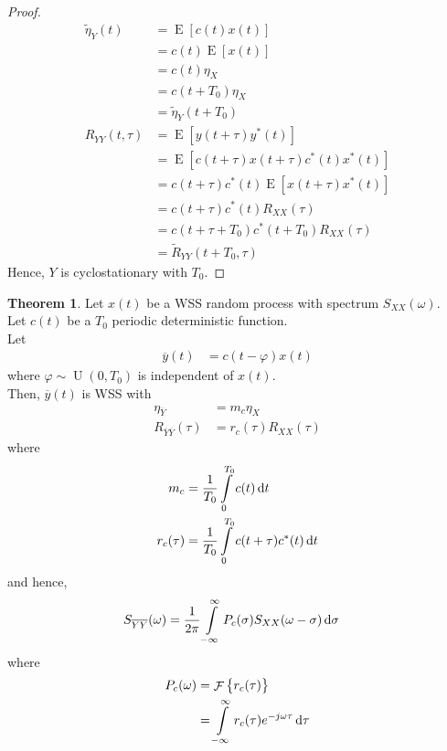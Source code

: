 \documentclass[titlepage, fleqn, a4paper, 12pt, twoside]{article}
\theoremstyle{definition}
\theoremstyle{theorem}
\newtheorem{theorem}{Theorem}
\renewcommand{\tilde}{\widetilde}
\DeclareMathOperator{\expct}{\mathrm{E}}
\DeclareMathOperator{\uniform}{\mathrm{U}}
\DeclareMathOperator{\FT}{\mathcal{F}}
\begin{document}
\begin{proof}
	\begin{align*}
		\tilde{\eta}_Y(t) &= \expct\left[ c(t) x(t) \right]\\
		&= c(t) \expct\left[ x(t) \right]\\
		&= c(t) \eta_X\\
		&= c(t + T_0) \eta_X\\
		&= \tilde{\eta}_Y(t + T_0)\\
		R_{Y Y}(t,\tau) &= \expct\left[ y(t + \tau) y^*(t) \right]\\
		&= \expct\left[ c(t + \tau) x(t + \tau) c^*(t) x^*(t) \right]\\
		&= c(t + \tau) c^*(t) \expct\left[ x(t + \tau) x^*(t) \right]\\
		&= c(t + \tau) c^*(t) R_{X X}(\tau)\\
		&= c(t + \tau + T_0) c^*(t + T_0) R_{X X}(\tau)\\
		&= \tilde{R}_{Y Y}(t + T_0,\tau)
	\end{align*}
	Hence, $Y$ is cyclostationary with $T_0$.
\end{proof}

\begin{theorem}
	Let $x(t)$ be a WSS random process with spectrum $S_{X X}(\omega)$.\\
	Let $c(t)$ be a $T_0$ periodic deterministic function.\\
	Let
	\begin{align*}
		\overline{y}(t) &= c(t - \varphi) x(t)
	\end{align*}
	where $\varphi \sim \uniform(0,T_0)$ is independent of $x(t)$.\\
	Then, $\overline{y}(t)$ is WSS with
	\begin{align*}
		\eta_{\overline{Y}} &= m_c \eta_X\\
		R_{\overline{Y} \overline{Y}}(\tau) &= r_c(\tau) R_{X X}(\tau)
	\end{align*}
	where
	\begin{align*}
		m_c &= \frac{1}{T_0} \int\limits_{0}^{T_0} c(t) \dif t\\
		r_c(\tau) &= \frac{1}{T_0} \int\limits_{0}^{T_0} c(t + \tau) c^*(t) \dif t
	\end{align*}
	and hence,
	\begin{align*}
		S_{\overline{Y} \overline{Y}}(\omega) &= \frac{1}{2 \pi} \int\limits_{-\infty}^{\infty} P_c(\sigma) S_{X X}(\omega - \sigma) \dif \sigma
	\end{align*}
	where
	\begin{align*}
		P_c(\omega) &= \FT\left\{ r_c(\tau) \right\}\\
		&= \int\limits_{-\infty}^{\infty} r_c(\tau) e^{-j \omega \tau} \dif \tau
	\end{align*}
	\label{thm:multiplication_in_time_for_stochastic_signal_and_periodic_deterministic_signal_dependent_on_random_variable}
\end{theorem}
\end{document}
